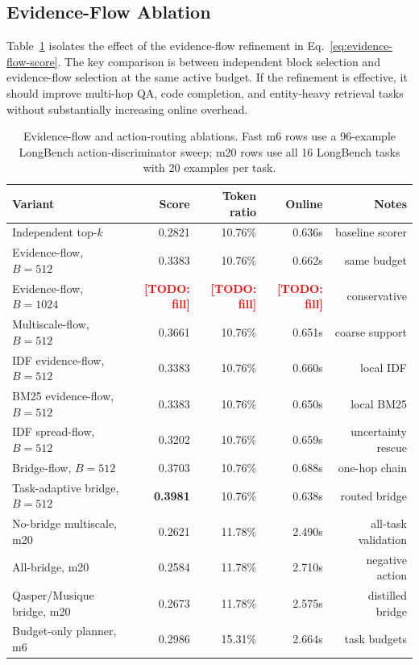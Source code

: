 \documentclass{article}
\newcommand{\todoexp}[1]{\textcolor{red}{\textbf{[TODO: #1]}}}
\begin{document}
\subsection{Evidence-Flow Ablation}

Table~\ref{tab:evidence-flow-ablation} isolates the effect of the evidence-flow refinement in Eq.~\ref{eq:evidence-flow-score}.
The key comparison is between independent block selection and evidence-flow selection at the same active budget.
If the refinement is effective, it should improve multi-hop QA, code completion, and entity-heavy retrieval tasks without substantially increasing online overhead.

\begin{table}[t]
\centering
\caption{Evidence-flow and action-routing ablations. Fast m6 rows use a 96-example LongBench action-discriminator sweep; m20 rows use all 16 LongBench tasks with 20 examples per task.}
\label{tab:evidence-flow-ablation}
\begin{tabular}{lrrrr}
\toprule
Variant & Score & Token ratio & Online & Notes \\
\midrule
Independent top-$k$ & 0.2821 & 10.76\% & 0.636s & baseline scorer \\
Evidence-flow, $B=512$ & 0.3383 & 10.76\% & 0.662s & same budget \\
Evidence-flow, $B=1024$ & \todoexp{fill} & \todoexp{fill} & \todoexp{fill} & conservative \\
Multiscale-flow, $B=512$ & 0.3661 & 10.76\% & 0.651s & coarse support \\
IDF evidence-flow, $B=512$ & 0.3383 & 10.76\% & 0.660s & local IDF \\
BM25 evidence-flow, $B=512$ & 0.3383 & 10.76\% & 0.650s & local BM25 \\
IDF spread-flow, $B=512$ & 0.3202 & 10.76\% & 0.659s & uncertainty rescue \\
Bridge-flow, $B=512$ & 0.3703 & 10.76\% & 0.688s & one-hop chain \\
Task-adaptive bridge, $B=512$ & \textbf{0.3981} & 10.76\% & 0.638s & routed bridge \\
No-bridge multiscale, m20 & 0.2621 & 11.78\% & 2.490s & all-task validation \\
All-bridge, m20 & 0.2584 & 11.78\% & 2.710s & negative action \\
Qasper/Musique bridge, m20 & 0.2673 & 11.78\% & 2.575s & distilled bridge \\
Budget-only planner, m6 & 0.2986 & 15.31\% & 2.664s & task budgets \\

\end{tabular}
\end{table}
\end{document}
